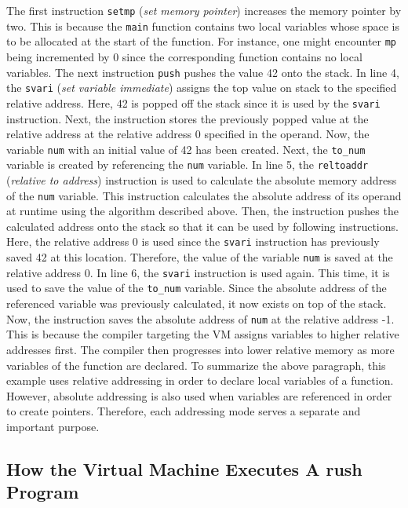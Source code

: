 The first instruction \texttt{setmp} (\emph{set memory pointer}) increases the memory pointer by two.
This is because the \texttt{main} function contains two local variables whose space is to be allocated at the start of the function.
For instance, one might encounter \texttt{mp} being incremented by 0 since the corresponding function contains no local variables.
The next instruction \texttt{push} pushes the value 42 onto the stack.
In line 4, the \texttt{svari} (\emph{set variable immediate}) assigns the top value on stack to the specified relative address.
Here, 42 is popped off the stack since it is used by the \texttt{svari} instruction.
Next, the instruction stores the previously popped value at the relative address at the relative address 0 specified in the operand.
Now, the variable \texttt{num} with an initial value of 42 has been created.
Next, the \texttt{to\_num} variable is created by referencing the \texttt{num} variable.
In line 5, the \texttt{reltoaddr} (\emph{relative to address}) instruction is used to calculate the absolute memory address of the \texttt{num} variable.
This instruction calculates the absolute address of its operand at runtime using the algorithm described above.
Then, the instruction pushes the calculated address onto the stack so that it can be used by following instructions.
Here, the relative address 0 is used since the \texttt{svari} instruction has previously saved 42 at this location.
Therefore, the value of the variable \texttt{num} is saved at the relative address 0.
In line 6, the \texttt{svari} instruction is used again.
This time, it is used to save the value of the \texttt{to\_num} variable.
Since the absolute address of the referenced variable was previously calculated, it now exists on top of the stack.
Now, the instruction saves the absolute address of \texttt{num} at the relative address -1.
This is because the compiler targeting the VM assigns variables to higher relative addresses first.
The compiler then progresses into lower relative memory as more variables of the function are declared.
To summarize the above paragraph, this example uses relative addressing in order to declare local variables of a function.
However, absolute addressing is also used when variables are referenced in order to create pointers.
Therefore, each addressing mode serves a separate and important purpose.

\subsection{How the Virtual Machine Executes A rush Program}

